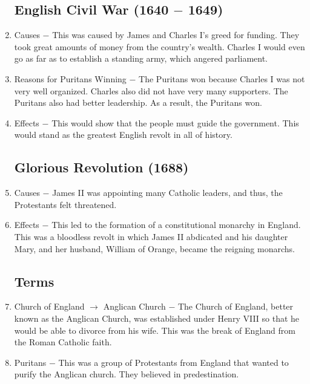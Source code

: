 \documentclass[12pt]{article}
\begin{document}
\begin{enumerate}
\subsection{English Civil War (1640 $-$ 1649)}

\item Causes $-$ This was caused by James and Charles I's greed for funding. They took great amounts of money from the country's wealth. Charles I would even go as far as to establish a standing army, which angered parliament. 

\item Reasons for Puritans Winning $-$ The Puritans won because Charles I was not very well organized. Charles also did not have very many supporters. The Puritans also had better leadership. As a result, the Puritans won.

\item Effects $-$ This would show that the people must guide the government. This would stand as the greatest English revolt in all of history.

\subsection{Glorious Revolution (1688)}

\item Causes $-$ James II was appointing many Catholic leaders, and thus, the Protestants felt threatened.

\item Effects $-$ This led to the formation of a constitutional monarchy in England. This was a bloodless revolt in which James II abdicated and his daughter Mary, and her husband, William of Orange, became the reigning monarchs.

\subsection{Terms}

\item Church of England $\rightarrow$ Anglican Church $-$ The Church of England, better known as the Anglican Church, was established under Henry VIII so that he would be able to divorce from his wife. This was the break of England from the Roman Catholic faith.

\item Puritans $-$  This was a group of Protestants from England that wanted to purify the Anglican church. They believed in predestination.


\end{enumerate}
\end{document}
